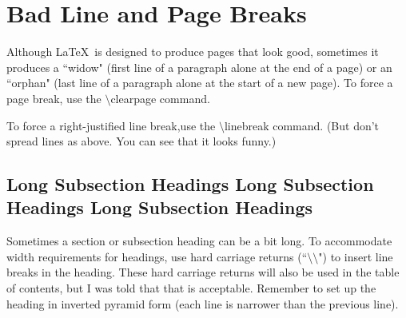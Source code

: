 \section{Bad Line and Page Breaks}


Although \LaTeX \ is designed to produce pages that look good,
sometimes it produces a ``widow" (first line of a paragraph
alone at the end of a page) or an ``orphan"
(last line of a paragraph alone at the start of a new page).
To force a page break, use the
$\setminus $clearpage command.


To force a right-justified line break,\linebreak use the
$\setminus $linebreak command.
(But don't spread lines as above. You can see that it looks funny.)



\subsection{Long Subsection Headings 
Long Subsection \\
Headings 
Long Subsection Headings
}


Sometimes a section or subsection heading can be a bit long.
To accommodate width requirements for headings, 
use hard carriage returns (``$\setminus \setminus $")
to insert line breaks in the heading. These hard carriage returns 
will also be used in the table of contents, but 
I was told that that is acceptable. 
Remember to set up the heading in inverted pyramid form
(each line is narrower than the previous line).


